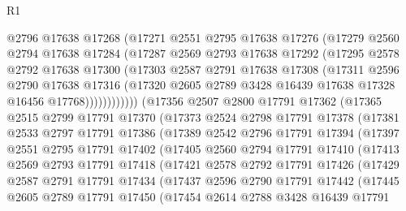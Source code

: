 \begin{lexlean}{R1}
\begin{coremodule}
              @2796
              @17638
              @17268
              (@17271
                @2551
                @2795
                @17638
                @17276
                (@17279
                  @2560
                  @2794
                  @17638
                  @17284
                  (@17287
                    @2569
                    @2793
                    @17638
                    @17292
                    (@17295
                      @2578
                      @2792
                      @17638
                      @17300
                      (@17303
                        @2587
                        @2791
                        @17638
                        @17308
                        (@17311
                          @2596
                          @2790
                          @17638
                          @17316
                          (@17320 @2605 @2789 @3428 @16439 @17638 @17328 @16456 @17768))))))))))))
    (@17356
      @2507
      @2800
      @17791
      @17362
      (@17365
        @2515
        @2799
        @17791
        @17370
        (@17373
          @2524
          @2798
          @17791
          @17378
          (@17381
            @2533
            @2797
            @17791
            @17386
            (@17389
              @2542
              @2796
              @17791
              @17394
              (@17397
                @2551
                @2795
                @17791
                @17402
                (@17405
                  @2560
                  @2794
                  @17791
                  @17410
                  (@17413
                    @2569
                    @2793
                    @17791
                    @17418
                    (@17421
                      @2578
                      @2792
                      @17791
                      @17426
                      (@17429
                        @2587
                        @2791
                        @17791
                        @17434
                        (@17437
                          @2596
                          @2790
                          @17791
                          @17442
                          (@17445
                            @2605
                            @2789
                            @17791
                            @17450
                            (@17454
                              @2614
                              @2788
                              @3428
                              @16439
                              @17791

\end{coremodule}
\end{lexlean}
